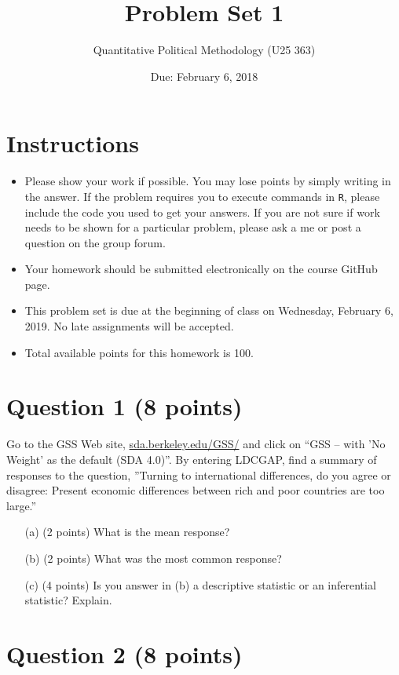 \documentclass[12pt,letterpaper]{article}
\title{Problem Set 1}
\date{Due: February 6, 2018}
\author{Quantitative Political Methodology (U25 363)}
\begin{document}
	\maketitle
	
	\section*{Instructions}
	\begin{itemize}
		\item Please show your work if possible. You may lose points by simply writing in the answer. If the problem requires you to execute commands in \texttt{R}, please include the code you used to get your answers. If you are not sure if work needs to be shown for a particular problem, please ask a me or post a question on the group forum.
		\item Your homework should be submitted electronically on the course GitHub page.
		\item This problem set is due at the beginning of class on Wednesday, February 6, 2019. No late assignments will be accepted.
		\item Total available points for this homework is 100.
	\end{itemize}
	
	
	\section*{Question 1 (8 points)}
	
	Go to the GSS Web site,  \href{http://sda.berkeley.edu/GSS/}{sda.berkeley.edu/GSS/} and click on “GSS – with ’No Weight’ as the default (SDA 4.0)”. By entering LDCGAP, find a summary of responses to the question, ”Turning to international differences, do you agree or disagree: Present economic differences between rich and poor countries are too large.”
	\begin{itemize}
		\item[(a)] (2 points) What is the mean response?
		\item[(b)] (2 points) What was the most common response?
		\item[(c)] (4 points) Is you answer in (b) a descriptive statistic or an inferential statistic? Explain.
	\end{itemize}
	
	\section*{Question 2 (8 points)}
	
\end{document}
